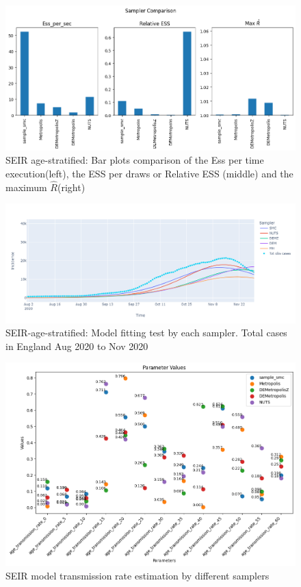 \documentclass[nonatbib,preprint,12pt,authoryear]{elsarticle}
\begin{document}
\begin{figure}[H]
    \centering
    \includegraphics[width=0.9\linewidth, height = 0.5\linewidth]{Figures/Model_2/SEIR_bar_comparison.png}
    \caption{SEIR age-stratified: Bar plots comparison of the Ess per time execution(left), the ESS per draws or Relative ESS (middle) and the maximum $\hat{R}$(right)}
    \label{fig:SEIR_Bar_plot_Comparison}
\end{figure}

\begin{figure}[H]
    \centering
    \includegraphics[width=0.9\linewidth, height = 0.5\linewidth]{Figures/Model_2/fitting_test.png}
    \caption{SEIR-age-stratified: Model fitting test by each sampler. Total cases in England Aug 2020 to Nov 2020}
    \label{fig:SEIR_fitting_test}
\end{figure}

\begin{figure}[H]
    \centering
    \includegraphics[width=0.9\linewidth]{Figures/Model_2/transm_rate_estim_by_sampler.png}
    \caption{SEIR model transmission rate estimation by different samplers}
    \label{fig:SEIR:transm_rate_estim_by_sampler}
\end{figure}
\end{document}
